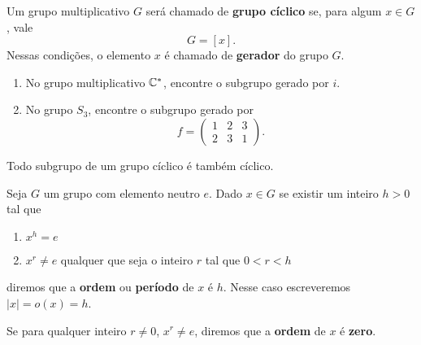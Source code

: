 \documentclass{beamer}
\begin{document}
    \begin{frame}
        \begin{definicao}
            Um grupo multiplicativo $G$ será chamado de \textbf{grupo cíclico} se, para algum $x \in G$, vale
            \[
                G = [x].
            \]
            Nessas condições, o elemento $x$ é chamado de \textbf{gerador} do grupo $G$.
        \end{definicao}
    \end{frame}

    \begin{frame}
        \begin{exemplos}
            \begin{enumerate}[label={\arabic*})]
                \item No grupo multiplicativo $\mathbb{C}^*$, encontre o subgrupo gerado por $i$.

                \item No grupo $S_3$, encontre o subgrupo gerado por
                \[
                    f = \begin{pmatrix}
                        1 & 2 & 3\\
                        2 & 3 & 1
                    \end{pmatrix}.
                \]
            \end{enumerate}
        \end{exemplos}
    \end{frame}

    \begin{frame}
        \begin{proposicao}
            Todo subgrupo de um grupo cíclico é também cíclico.
        \end{proposicao}
    \end{frame}

    \begin{frame}
        \begin{definicao}
            Seja $G$ um grupo com elemento neutro $e$. Dado $x \in G$ se existir um inteiro $h > 0$ tal que
            \begin{enumerate}[label={\arabic*})]
                \item $x^h = e$
                \item $x^r \ne e$ qualquer que seja o inteiro $r$ tal que $0 < r < h$
            \end{enumerate}
            diremos que a \textbf{ordem} ou \textbf{período} de $x$ é $h$. Nesse caso escreveremos $|x| = o(x) = h$.

            Se para qualquer inteiro $r \ne 0$, $x^r \ne e$, diremos que a \textbf{ordem} de $x$ é \textbf{zero}.
        \end{definicao}
    \end{frame}
\end{document}
